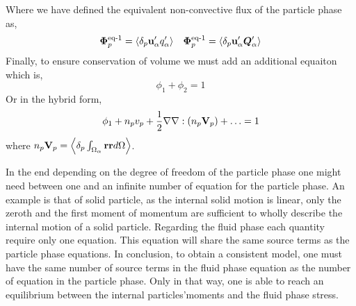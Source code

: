 Where we have defined the equivalent non-convective flux of the particle phase as, 
\begin{align*}
    \bm\Phi_p^\text{eq-1}= \left<\delta_p \textbf{u}_\alpha' q_\alpha'\right>
    && \bm\Phi_p^\text{eq-1}= \left<\delta_p \textbf{u}_\alpha' \bm{Q}_\alpha'\right>
\end{align*}
Finally, to ensure conservation of volume we must add an additional equaiton which is, 
\begin{equation}
    \phi_1 + \phi_2 = 1
\end{equation}
Or in the hybrid form, 
\begin{equation}
    \phi_1 + n_p v_p +\frac{1}{2} \mathbf{\nabla}\mathbf{\nabla} : (n_p \textbf{V}_p) + \ldots = 1
\end{equation}
where $n_p\textbf{V}_p = \left<\delta_p \int_{\Omega_{\alpha}} \textbf{rr} d\Omega\right>$. 


In the end depending on the degree of freedom of the particle phase one might need between one and an infinite number of equation for the particle phase. 
An example is that of solid particle, as the internal solid motion is linear, only the zeroth and the first moment of momentum are sufficient to wholly describe the internal motion of a solid particle. 
Regarding the fluid phase each quantity require only one equation. 
This equation will share the same source terms as the particle phase equations. 
In conclusion, to obtain a consistent model, one must have the same number of source terms in the fluid phase equation as the number of equation in the particle phase. 
Only in that way, one is able to reach an equilibrium between the internal particles'moments and the fluid phase stress. 



